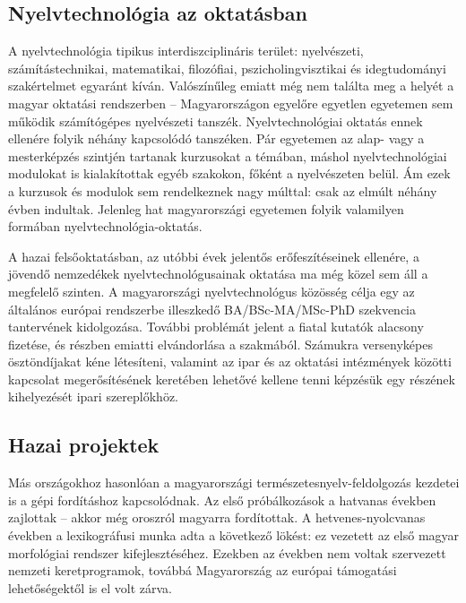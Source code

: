 \begin{multicols}{2}
\subsection{Nyelvtechnológia az oktatásban}

A nyelvtechnológia tipikus in\-ter\-disz\-cip\-li\-ná\-ris terület: nyelvészeti, számítástechnikai, matematikai, filozófiai, pszi\-cho\-ling\-visz\-ti\-kai és idegtudományi szakértelmet egyaránt kíván. Valószínűleg emiatt még nem találta meg a helyét a ma\-gyar oktatási rendszerben -- Magyarországon egyelőre egyetlen egyetemen sem működik számítógépes nyelvészeti tanszék. Nyelvtechnológiai oktatás ennek ellenére folyik néhány kapcsolódó tanszéken. Pár egyetemen az alap- vagy a mesterképzés szintjén tartanak kurzusokat a témában, máshol nyelvtechnológiai modulokat is kialakítottak egyéb szakokon, főként a nyelvészeten belül. Ám ezek a kurzusok és modulok sem rendelkeznek nagy múlttal: csak az elmúlt néhány évben indultak. Jelenleg hat ma\-gyar\-or\-szá\-gi egyetemen folyik valamilyen formában nyelvtechnológia-oktatás.

A hazai felsőoktatásban, az utóbbi évek jelentős erőfeszítéseinek ellenére, a jö\-ven\-dő nemzedékek nyelvtechnológusainak oktatása ma még közel sem áll a megfelelő szinten. A magyarországi nyelvtechnológus közösség célja egy az általános európai rendszerbe illeszkedő BA/BSc-MA/MSc-PhD szekvencia tantervének kidolgozása. További problémát jelent a fiatal kutatók alacsony fizetése, és részben emiatti elvándorlása a szakmából. Számukra versenyképes ösztöndíjakat kéne létesíteni, valamint az ipar és az oktatási intézmények közötti kapcsolat meg\-erő\-sí\-té\-sé\-nek keretében lehetővé kellene tenni képzésük egy részének kihelyezését ipari szereplőkhöz. 

\subsection{Hazai projektek}

Más országokhoz hasonlóan a ma\-gyar\-or\-szá\-gi természetesnyelv-feldolgozás kezdetei is a gépi fordításhoz kapcsolódnak. Az első próbálkozások a hatvanas években zajlottak -- akkor még oroszról ma\-gyar\-ra fordítottak. A hetvenes-nyolcvanas években a lexikográfusi munka adta a következő lökést: ez vezetett az első ma\-gyar morfológiai rendszer kifejlesztéséhez. Ezekben az években nem voltak szervezett nemzeti keretprogramok, továbbá Ma\-gyar\-or\-szág az európai támogatási le\-he\-tő\-sé\-gek\-től is el volt zárva.  


\end{multicols}
